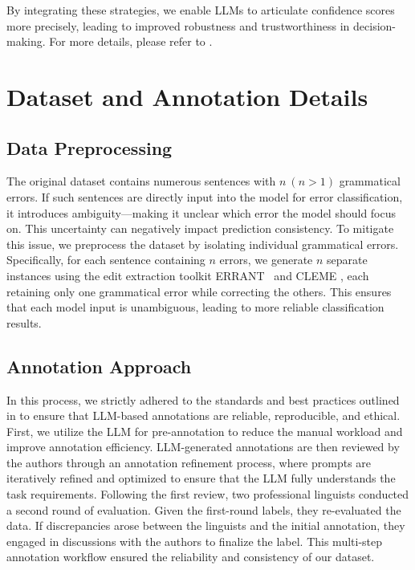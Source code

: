 By integrating these strategies, we enable LLMs to articulate confidence scores more precisely, leading to improved robustness and trustworthiness in decision-making. For more details, please refer to \citet{confidence}.

\section{Dataset and Annotation Details}
\subsection{Data Preprocessing}
\label{appendix extract single}
The original dataset contains numerous sentences with $n \ (n>1)$ grammatical errors. If such sentences are directly input into the model for error classification, it introduces ambiguity—making it unclear which error the model should focus on. This uncertainty can negatively impact prediction consistency. To mitigate this issue, we preprocess the dataset by isolating individual grammatical errors. Specifically, for each sentence containing $n$ errors, we generate $n$ separate instances using the edit extraction toolkit ERRANT~\cite{errant} and CLEME \cite{ye-etal-2023-cleme,ye2024cleme2}, each retaining only one grammatical error while correcting the others. This ensures that each model input is unambiguous, leading to more reliable classification results.



\subsection{Annotation Approach}
\label{appendix annotation}
In this process, we strictly adhered to the standards and best practices outlined in \citet{annotation_one} to ensure that LLM-based annotations are reliable, reproducible, and ethical. First, we utilize the LLM for pre-annotation to reduce the manual workload and improve annotation efficiency. LLM-generated annotations are then reviewed by the authors through an annotation refinement process, where prompts are iteratively refined and optimized to ensure that the LLM fully understands the task requirements.  Following the first review, two professional linguists conducted a second round of evaluation. Given the first-round labels, they re-evaluated the data. If discrepancies arose between the linguists and the initial annotation, they engaged in discussions with the authors to finalize the label. This multi-step annotation workflow ensured the reliability and consistency of our dataset.

